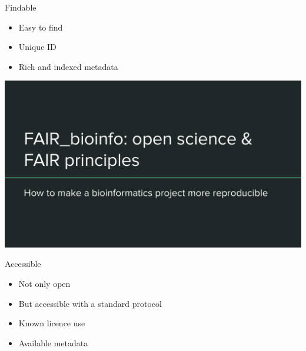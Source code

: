 \begin{frame}
\begin{block}{Findable}
\begin{itemize}
\item Easy to find
\item Unique ID
\item Rich and indexed metadata
\end{itemize}
\end{block}
\end{frame}

\begin{frame}
\includegraphics[page=9,scale=0.55]{01_OS_and_FAIR_intro.pdf}
\end{frame}

\begin{frame}
\begin{block}{Accessible}
\begin{itemize}
\item Not only open
\item But accessible with a standard protocol
\item Known licence use
\item Available metadata
\end{itemize}
\end{block}
\end{frame}

